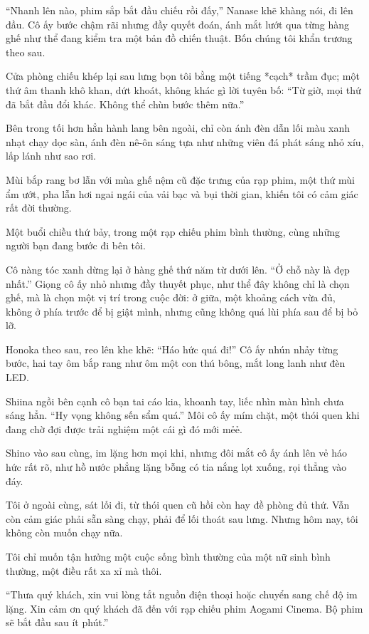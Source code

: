 \documentclass[../main.tex]{subfiles}
\begin{document}
``Nhanh lên nào, phim sắp bắt đầu chiếu rồi đấy,'' Nanase khẽ khàng nói, đi lên đầu. Cô ấy bước chậm rãi nhưng đầy quyết đoán, ánh mắt lướt qua từng hàng ghế như thể đang kiểm tra một bản đồ chiến thuật.  Bốn chúng tôi khẩn trương theo sau.

Cửa phòng chiếu khép lại sau lưng bọn tôi bằng một tiếng *cạch* trầm đục; một thứ âm thanh khô khan, dứt khoát, không khác gì lời tuyên bố: ``Từ giờ, mọi thứ đã bắt đầu đổi khác. Không thể chùn bước thêm nữa.''

Bên trong tối hơn hẳn hành lang bên ngoài, chỉ còn ánh đèn dẫn lối màu xanh nhạt chạy dọc sàn, ánh đèn nê-ôn sáng tựa như những viên đá phát sáng nhỏ xíu, lấp lánh như sao rơi.

Mùi bắp rang bơ lẫn với mùa ghế nệm cũ đặc trưng của rạp phim, một thứ mùi ẩm ướt, pha lẫn hơi ngai ngái của vải bạc và bụi thời gian, khiến tôi có cảm giác rất đời thường.

Một buổi chiều thứ bảy, trong một rạp chiếu phim bình thường, cùng những người bạn đang bước đi bên tôi.

Cô nàng tóc xanh dừng lại ở hàng ghế thứ năm từ dưới lên.  ``Ở chỗ này là đẹp nhất.''   Giọng cô ấy nhỏ nhưng đầy thuyết phục, như thể đây không chỉ là chọn ghế, mà là chọn một vị trí trong cuộc đời: ở giữa, một khoảng cách vừa đủ, không ở phía trước để bị giật mình, nhưng cũng không quá lùi phía sau để bị bỏ lỡ.

Honoka theo sau, reo lên khe khẽ:  ``Háo hức quá đi!'' Cô ấy nhún nhảy từng bước, hai tay ôm bắp rang như ôm một con thú bông, mắt long lanh như đèn LED.

Shiina ngồi bên cạnh cô bạn tai cáo kia, khoanh tay, liếc nhìn màn hình chưa sáng hẳn. ``Hy vọng không sến sẩm quá.''  Môi cô ấy mím chặt, một thói quen khi đang chờ đợi được trải nghiệm một cái gì đó mới mẻẻ.

Shino vào sau cùng, im lặng hơn mọi khi, nhưng đôi mắt cô ấy ánh lên vẻ háo hức rất rõ, như hồ nước phẳng lặng bỗng có tia nắng lọt xuống, rọi thẳng vào đáy.

Tôi ở ngoài cùng, sát lối đi, từ thói quen cũ  hồi còn hay đề phòng đủ thứ. Vẫn còn cảm giác phải sẵn sàng chạy, phải để lối thoát sau lưng. Nhưng hôm nay, tôi không còn muốn chạy nữa.

Tôi chỉ muốn tận hưởng một cuộc sống bình thường của một nữ sinh bình thường, một điều rất xa xỉ mà thôi.

``Thưa quý khách, xin vui lòng tắt nguồn điện thoại hoặc chuyển sang chế độ im lặng. Xin cảm ơn quý khách đã đến với rạp chiếu phim Aogami Cinema. Bộ phim sẽ bắt đầu sau ít phút.''
\end{document}
